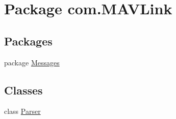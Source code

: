 \hypertarget{namespacecom_1_1MAVLink}{}\section{Package com.\+M\+A\+V\+Link}
\label{namespacecom_1_1MAVLink}
\subsection*{Packages}
\begin{DoxyCompactItemize}
\item 
package \mbox{\hyperlink{namespacecom_1_1MAVLink_1_1Messages}{Messages}}
\end{DoxyCompactItemize}
\subsection*{Classes}
\begin{DoxyCompactItemize}
\item 
class \mbox{\hyperlink{classcom_1_1MAVLink_1_1Parser}{Parser}}
\end{DoxyCompactItemize}
